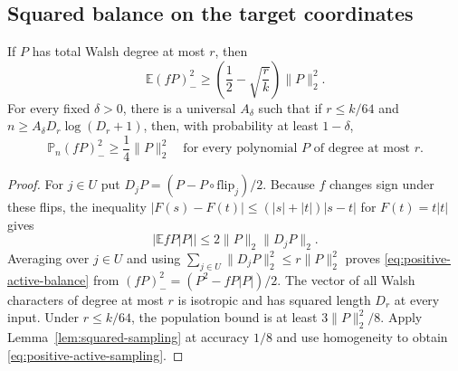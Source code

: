 \subsection{Squared balance on the target coordinates}
\begin{lemma}
\label{lem:positive-active}
If $P$ has total Walsh degree at most $r$, then
\begin{equation}
 \mathbb E(fP)_-^2
 \ge\left(\frac12-\sqrt{\frac rk}\right)\|P\|_2^2.
 \label{eq:positive-active-balance}
\end{equation}
For every fixed $\delta>0$, there is a universal $A_\delta$ such that
if $r\le k/64$ and $n\ge A_\delta D_r\log(D_r+1)$, then, with
probability at least $1-\delta$,
\begin{equation}
 \mathbb P_n(fP)_-^2\ge\frac14\|P\|_2^2
 \quad\text{for every polynomial $P$ of degree at most $r$}.
 \label{eq:positive-active-sampling}
\end{equation}
\end{lemma}
\begin{proof}
For $j\in U$ put $D_jP=(P-P\circ\mathrm{flip}_j)/2$.
Because $f$ changes sign under these flips, the inequality
$|F(s)-F(t)|\le(|s|+|t|)|s-t|$ for $F(t)=t|t|$ gives
\[
 |\mathbb E fP|P||\le2\|P\|_2\|D_jP\|_2.
\]
Averaging over $j\in U$ and using
$\sum_{j\in U}\|D_jP\|_2^2\le r\|P\|_2^2$ proves
\eqref{eq:positive-active-balance} from
$(fP)_-^2=(P^2-fP|P|)/2$.
The vector of all Walsh characters of degree at most $r$ is isotropic
and has squared length $D_r$ at every input. Under $r\le k/64$,
the population bound is at least $3\|P\|_2^2/8$.
Apply Lemma~\ref{lem:squared-sampling} at accuracy $1/8$ and use
homogeneity to obtain \eqref{eq:positive-active-sampling}.
\end{proof}

